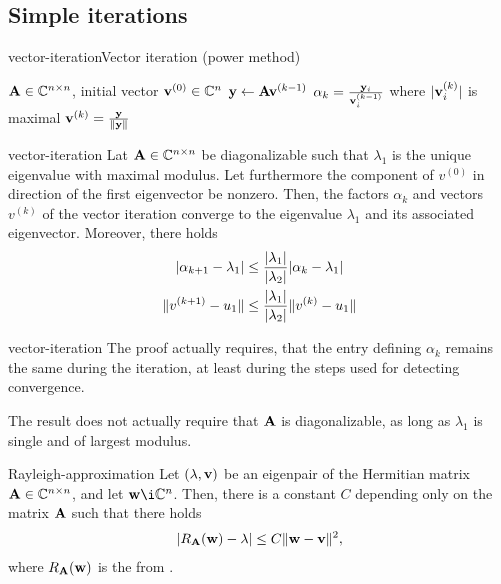 \subsection{Simple iterations}

\begin{Algorithm*}{vector-iteration}{Vector iteration (power method)}
  \begin{algorithmic}[1]
    \Require $\mathbf A\in\mathbb C^{n\times n}$, initial vector $\mathbf v^{(0)}\in\mathbb C^n$
    \State $\mathbf y \gets \mathbf A \mathbf v^{(k-1)}$
    \State $\alpha_k = \frac{\mathbf y_i}{\mathbf v^{(k-1)}_i}$
    where $\lvert\mathbf v^{(k)}_i\rvert$ is maximal
    \State $\mathbf v^{(k)} = \frac{\mathbf y}{\lVert\mathbf y\rVert}$
    \EndFor
  \end{algorithmic}
\end{Algorithm*}

\begin{Theorem}{vector-iteration}
  Lat $\mathbf A\in\mathbb C^{n\times n}$ be diagonalizable such that $\lambda_1$ is the
  unique eigenvalue with maximal modulus. Let furthermore the
  component of $v^{(0)}$ in direction of the first eigenvector be
  nonzero. Then, the factors $\alpha_k$ and vectors $v^{(k)}$ of the
  vector iteration converge to the eigenvalue $\lambda_1$ and its
  associated eigenvector. Moreover, there holds
  \begin{align}
    \lvert\alpha_{k+1}-\lambda_1\rvert
    &\le \frac{\lvert\lambda_1\rvert}{\lvert\lambda_2\rvert} \lvert\alpha_{k}-\lambda_1\rvert\\
    \lVert v^{(k+1)}-u_1\rVert
    &\le \frac{\lvert\lambda_1\rvert}{\lvert\lambda_2\rvert} \lVert v^{(k)}-u_1\rVert
  \end{align}
\end{Theorem}

\begin{Remark}{vector-iteration}
  The proof actually requires, that the entry defining $\alpha_k$
  remains the same during the iteration, at least during the steps
  used for detecting convergence.

  The result does not actually require that $\mathbf A$ is diagonalizable,
  as long as $\lambda_1$ is single and of largest modulus.
\end{Remark}

\begin{Lemma}{Rayleigh-approximation}
  Let $(\lambda,\mathbf v)$ be an eigenpair of the Hermitian matrix
  $\mathbf A\in\mathbb C^{n\times n}$, and let $\vw\i\C^n$. Then, there is a constant $C$ depending only on the matrix $\mathbf A$ such that there holds
  \begin{gather}
    \lvert R_\mathbf A(\mathbf w)-\lambda\rvert \le C \lVert\mathbf w-\mathbf v\rVert^2,
  \end{gather}
  where $R_\mathbf A(\mathbf w)$ is the  from
  .
\end{Lemma}

